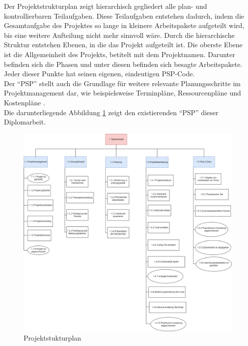 Der Projektstrukturplan zeigt hierarchisch gegliedert alle plan- und kontrollierbaren Teilaufgaben. Diese Teilaufgaben entstehen dadurch, indem die Gesamtaufgabe des Projektes so lange in kleinere Arbeitspakete aufgeteilt wird, bis eine weitere Aufteilung nicht mehr sinnvoll wäre. Durch die hierarchische Struktur entstehen Ebenen, in die das Projekt aufgeteilt ist. Die oberste Ebene ist die Allgemeinheit des Projekts, betitelt mit dem Projektnamen. Darunter befinden sich die Phasen und unter diesen befinden sich besagte Arbeitspakete. Jeder dieser Punkte hat seinen eigenen, eindeutigen PSP-Code.
\\Der \enquote{PSP} stellt auch die Grundlage für weitere relevante Planungsschritte im Projektmanagement dar, wie beispielsweise Terminpläne, Ressourcenpläne und Kostenpläne \cite[vgl.][]{Kindl_Niels:2023}. \\
Die darunterliegende Abbildung \ref{fig:projektstrukturplan} zeigt den existierenden \enquote{PSP} dieser Diplomarbeit.

\begin{figure}[H]
	\centering
	\includegraphics[width=1\linewidth]{Bilder/projektstrukturplan}
	\caption{Projektstukturplan}
	\label{fig:projektstrukturplan}
\end{figure}